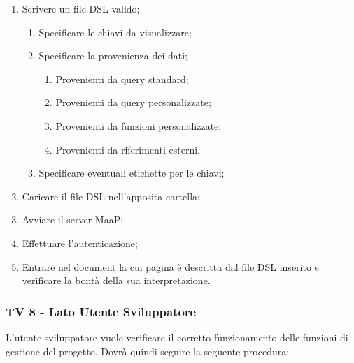 \begin{enumerate}
\item Scrivere un file DSL valido;
\begin{enumerate}
\item Specificare le chiavi da visualizzare;
\item Specificare la provenienza dei dati;
\begin{enumerate}
\item Provenienti da query standard;
\item Provenienti da query personalizzate;
\item Provenienti da funzioni personalizzate;
\item Provenienti da riferimenti esterni.
\end{enumerate}
\item Specificare eventuali etichette per le chiavi;
\end{enumerate}
\item Caricare il file DSL nell'apposita cartella;
\item Avviare il server MaaP;
\item Effettuare l'autenticazione;
\item Entrare nel document la cui pagina è descritta dal file DSL inserito e verificare la bontà della sua interpretazione.
\end{enumerate}


\subsubsection{TV 8 - Lato Utente Sviluppatore}

L'utente sviluppatore vuole verificare il corretto funzionamento delle funzioni di gestione del progetto.
Dovrà quindi seguire la seguente procedura:

